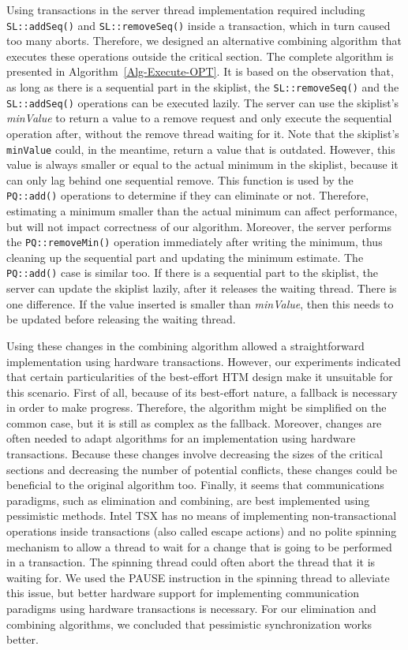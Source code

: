 Using transactions in the server thread implementation required including \texttt{SL::addSeq()} and \texttt{SL::removeSeq()} inside a transaction, which in turn caused too many aborts. Therefore, we designed an alternative combining algorithm that executes these operations outside the critical section. The complete algorithm is presented in Algorithm~\ref{Alg-Execute-OPT}. It is based on the observation that, as long as there is a sequential part in the skiplist, the \texttt{SL::removeSeq()} and the \texttt{SL::addSeq()} operations can be executed lazily. The server can use the skiplist's \emph{minValue} to return a value to a remove request and only execute the sequential operation after, without the remove thread waiting for it. Note that the skiplist's \texttt{minValue} could, in the meantime, return a value that is outdated. However, this value is always smaller or equal to the actual minimum in the skiplist, because it can only lag behind one sequential remove. This function is used by the \texttt{PQ::add()} operations to determine if they can eliminate or not. Therefore, estimating a minimum smaller than the actual minimum can affect performance, but will not impact correctness of our algorithm. Moreover, the server performs the \texttt{PQ::removeMin()} operation immediately after writing the minimum, thus cleaning up the sequential part and updating the minimum estimate. The \texttt{PQ::add()} case is similar too. If there is a sequential part to the skiplist, the server can update the skiplist lazily, after it releases the waiting thread. There is one difference. If the value inserted is smaller than \emph{minValue}, then this needs to be updated before releasing the waiting thread.

Using these changes in the combining algorithm allowed a straightforward implementation using hardware transactions. However, our experiments indicated that certain particularities of the best-effort HTM design make it unsuitable for this scenario. First of all, because of its  best-effort nature, a fallback is necessary in order to make progress. Therefore, the algorithm might be simplified on the common case, but it is still as complex as the fallback. Moreover, changes are often needed to adapt algorithms for an implementation using hardware transactions. Because these changes involve decreasing the sizes of the critical sections and decreasing the number of potential conflicts, these changes could be beneficial to the original algorithm too. Finally, it seems that communications paradigms, such as elimination and combining, are best implemented using pessimistic methods. Intel TSX has no means of implementing non-transactional operations inside transactions (also called escape actions) and no polite spinning mechanism to allow a thread to wait for a change that is going to be performed in a transaction. The spinning thread could often abort the thread that it is waiting for. We used the PAUSE instruction in the spinning thread to alleviate this issue, but better hardware support for implementing communication paradigms using hardware transactions is necessary. For our elimination and combining algorithms, we concluded that pessimistic synchronization works better. 

